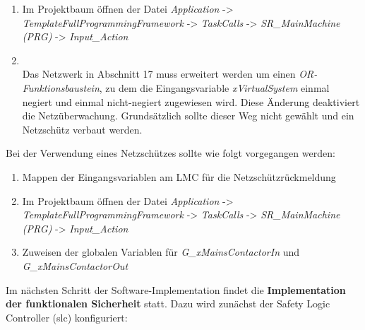 \documentclass[../../../Bachelorarbeit.tex]{subfiles}
\begin{document}
\begin{enumerate}
    \item Im Projektbaum öffnen der Datei \textit{Application} -> \textit{TemplateFullProgrammingFramework} -> \textit{TaskCalls} -> \textit{SR\_MainMachine (PRG)} -> \textit{Input\_Action}
    \item \begin{minipage}[t]{\linewidth}
        \raggedright
        \label{fig:my-img39}
    \end{minipage}
    \bigskip \\
    Das Netzwerk in Abschnitt 17 muss erweitert werden um einen \textit{OR-Funktionsbaustein}, zu dem die Eingangsvariable \textit{xVirtualSystem} einmal negiert und einmal nicht-negiert zugewiesen wird. Diese Änderung deaktiviert die Netzüberwachung. Grundsätzlich sollte dieser Weg nicht gewählt und ein Netzschütz verbaut werden. 
\end{enumerate}

Bei der Verwendung eines Netzschützes sollte wie folgt vorgegangen werden:

\begin{enumerate}
    \item Mappen der Eingangsvariablen am LMC für die Netzschützrückmeldung
    \item Im Projektbaum öffnen der Datei \textit{Application} -> \textit{TemplateFullProgrammingFramework} -> \textit{TaskCalls} -> \textit{SR\_MainMachine (PRG)} -> \textit{Input\_Action}
    \item Zuweisen der globalen Variablen für \textit{G\_xMainsContactorIn} und \\ \textit{G\_xMainsContactorOut}
\end{enumerate}

Im nächsten Schritt der Software-Implementation findet die \textbf{Implementation der funktionalen Sicherheit} statt. Dazu wird zunächst der Safety Logic Controller (\acs{slc}) konfiguriert:
\end{document}
